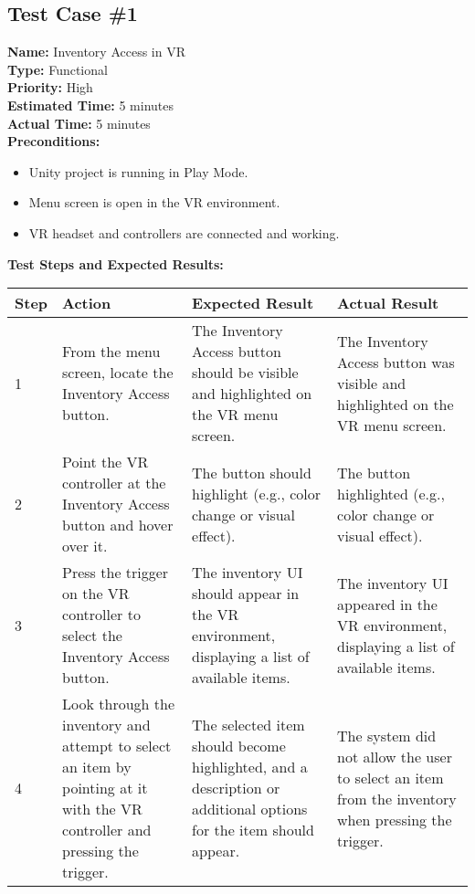 \documentclass[11pt]{article}
\begin{document}
\subsection{Test Case \#1}
\textbf{Name:} Inventory Access in VR \\
\textbf{Type:} Functional \\
\textbf{Priority:} High \\
\textbf{Estimated Time:} 5 minutes \\
\textbf{Actual Time:} 5 minutes \\
\textbf{Preconditions:} 
\begin{itemize}
\item Unity project is running in Play Mode.
\item Menu screen is open in the VR environment.
\item VR headset and controllers are connected and working.
\end{itemize}
\textbf{Test Steps and Expected Results:} \\
\begin{tabular}{@{} p{0.8cm} p{4.6cm} p{4.6cm} p{4.6cm} @{}}
\toprule
\textbf{Step} & \textbf{Action} & \textbf{Expected Result} & \textbf{Actual Result} \\
\midrule
1 & From the menu screen, locate the Inventory Access button. & The Inventory Access button should be visible and highlighted on the VR menu screen. & The Inventory Access button was visible and highlighted on the VR menu screen. \\
2 & Point the VR controller at the Inventory Access button and hover over it. & The button should highlight (e.g., color change or visual effect). & The button highlighted (e.g., color change or visual effect). \\
3 & Press the trigger on the VR controller to select the Inventory Access button. & The inventory UI should appear in the VR environment, displaying a list of available items. & The inventory UI appeared in the VR environment, displaying a list of available items. \\
4 & Look through the inventory and attempt to select an item by pointing at it with the VR controller and pressing the trigger. & The selected item should become highlighted, and a description or additional options for the item should appear. & The system did not allow the user to select an item from the inventory when pressing the trigger. \\
\bottomrule
\end{tabular}
\end{document}
